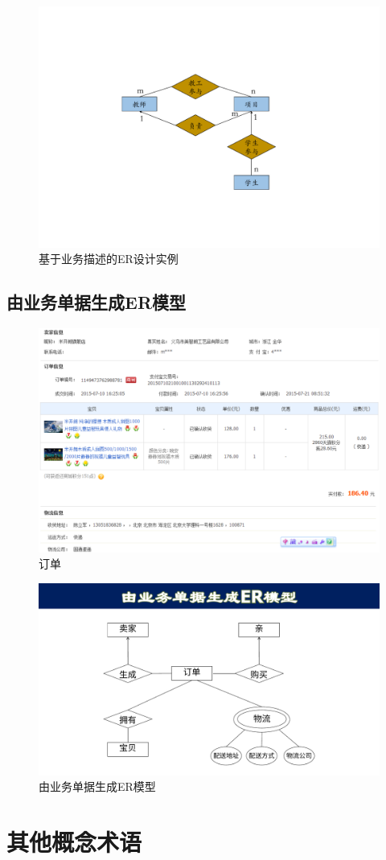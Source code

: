 \begin{figure}[H]
    \centering
    \includegraphics[width=.5\textwidth]{figure/ER实例1.pdf}
    \caption{基于业务描述的ER设计实例}
\end{figure}

\subsection{由业务单据生成ER模型}

\begin{figure}[H]
    \centering
    \includegraphics[width=.7\textwidth]{figure/ER实例2.png}
    \caption{订单}
\end{figure}

\begin{figure}[H]
    \centering
    \includegraphics[width=.6\textwidth]{figure/ER实例3.pdf}
    \caption{由业务单据生成ER模型}
\end{figure}

\section{其他概念术语}

